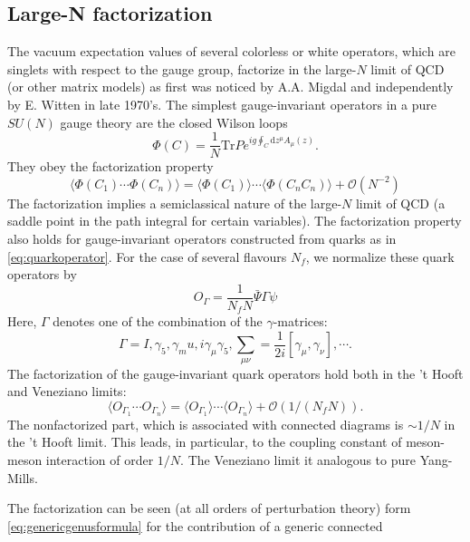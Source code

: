 \subsection{Large-N factorization}
The vacuum expectation values of several colorless or white operators, which
are singlets with respect to the gauge group, factorize in the large-$N$ limit
of QCD (or other matrix models) as first was noticed by A.A. Migdal and
independently by E. Witten in late 1970's. The simplest gauge-invariant
operators in a pure $SU(N)$ gauge theory are the closed Wilson loops
\begin{equation}
  \Phi(C) = \frac{1}{N}\mathrm{Tr}Pe^{ig\oint_{C}\mathrm{d}z^\mu A_\mu(z)}.
\end{equation}
They obey the factorization property
\begin{equation}
  \langle\Phi(C_1)\cdots\Phi(C_n)\rangle
  = \langle\Phi(C_1)\rangle\cdots\langle\Phi(C_nC_n)\rangle
  + \mathcal{O}(N^{-2})
\end{equation}
The factorization implies a semiclassical nature of the large-$N$ limit of QCD
(a saddle point in the  path integral for certain variables). 
The factorization property also holds for gauge-invariant operators constructed
from quarks as in \eqref{eq:quarkoperator}. For the case of several flavours
$N_f$, we normalize these quark operators by
\begin{equation}
O_\Gamma = \frac{1}{N_f N}\bar{\Psi}\Gamma\psi
\end{equation}
Here, $\Gamma$ denotes one of the combination of the $\gamma$-matrices:
\begin{equation}
  \Gamma = I,\gamma_5,\gamma_mu,i\gamma_\mu\gamma_5,\sum_{\mu\nu}
  = \frac{1}{2i}\left[\gamma_\mu,\gamma_\nu\right],\cdots.
\end{equation}
The factorization of the gauge-invariant quark operators hold both in the 
't Hooft and Veneziano limits:
\begin{equation}
\langle O_{\Gamma_1}\cdots O_{\Gamma_n}\rangle
= \langle O_{\Gamma_1}\rangle\cdots\langle O_{\Gamma_n}\rangle+
\mathcal{O}(1/(N_fN)).
\label{eq:factorizationproperty}
\end{equation}
The nonfactorized part, which is associated with connected diagrams is $\sim
1/N$ in the 't Hooft limit. This leads, in particular, to the coupling constant 
of meson-meson interaction of order $1/N$. The Veneziano limit it analogous to
pure Yang-Mills.
\par The factorization can be seen (at all orders of perturbation theory) form
\eqref{eq:genericgenusformula} for the contribution of a generic connected
